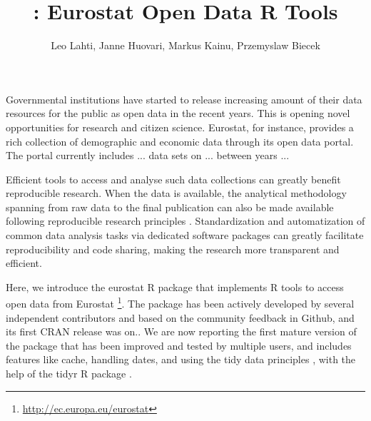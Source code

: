 \title{: Eurostat Open Data R Tools}
\author{Leo Lahti, Janne Huovari, Markus Kainu, Przemyslaw Biecek}

\maketitle



Governmental institutions have started to release increasing amount of
their data resources for the public as open data in the recent
years. This is opening novel opportunities for research and citizen
science. Eurostat, for instance, provides a rich collection of
demographic and economic data through its open data portal. The portal
currently includes ... data sets on ... between years ...

Efficient tools to access and analyse such data collections can
greatly benefit reproducible research. When the data is available, the
analytical methodology spanning from raw data to the final publication
can also be made available following reproducible research principles
\citep{Gandrud13}. Standardization and automatization of
common data analysis tasks via dedicated software packages can greatly
facilitate reproducibility and code sharing, making the research more
transparent and efficient.

Here, we introduce the eurostat R package that implements R tools to access open data from
Eurostat \footnote{\url{http://ec.europa.eu/eurostat}}. The package has been actively developed by several
independent contributors and based on the community feedback in
Github, and its first CRAN release was on.. We are now reporting the
first mature version of the package that has been improved and tested
by multiple users, and includes features like cache, handling dates,
and using the tidy data principles \citep{wickham2014}, with the help of
the tidyr R package \citep{tidyr}.


